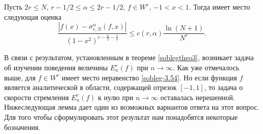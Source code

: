 
\begin{corollary} Пусть $2r\le N$, $r-1/2\le \alpha\le 2r-1/2$, $f\in W^r$, $-1<x<1$. Тогда имеет место следующая оценка
\begin{equation}\label{sobleg-5.31}
 \frac{|f(x)-\sigma_{r,N}^\alpha(f,x)|}
{(1-x^2)^{r-\frac{\alpha}{2}-\frac14}}\le c(r,\alpha)\frac{\ln(N+1)}{N^r}.
 \end{equation}
\end{corollary}


В связи с результатом, установленным в теореме \ref{soblegtheo3}, возникает задача об изучении поведения величины $E_{n}^r(f)$ при $n\to\infty$. Как уже отмечалось выше, для $f\in W^r$ имеет место неравенство \eqref{sobleg-3.54}. Но если функция $f$ является аналитической в области, содержащей отрезок $[-1,1]$, то задача о скорости стремления $E_{n}^r(f)$ к нулю при $n\to\infty$ оставалась нерешенной. Нижеследующая лемма дает один из возможных вариантов ответа на этот вопрос. Для того чтобы сформулировать этот результат нам понадобятся некоторые бозначения.

